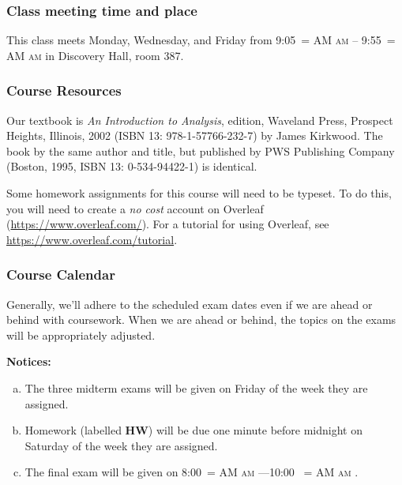 \documentclass[12pt]{article}
\makeatletter
\newcounter{ex}\setcounter{ex}{0}
\newenvironment{alphalist}{
  \begin{enumerate}[(a)]
    \addtolength{\itemsep}{-0.5\itemsep}}
  {\end{enumerate}}
\DeclareRobustCommand{\maybefakesc}[1]{%
  \ifnum\pdfstrcmp{\f@series}{\bfdefault}=\z@
    {\fontsize{\dimexpr0.8\dimexpr\f@size pt\relax}{0}\selectfont\uppercase{#1}}%
  \else
    \textsc{#1}%
  \fi
}
\newcommand\AM{\,\maybefakesc{am}\xspace}
\newcommand{\room}{Discovery Hall, room  387}
\newcommand{\meetingtime}{This class meets Monday, Wednesday, and Friday  from 
	9:05\AM -- 9:55\AM}
\newcommand{\finaldateandtime}{\printdate{13/12/\the\year} 8:00\AM{}---10:00 \AM}
\makeatother
\begin{document}
\subsubsection*{Class meeting time and place}

\meetingtime in \room.

\subsubsection*{Course Resources}

Our textbook is \emph{An Introduction to Analysis},  edition, Waveland Press, Prospect Heights, Illinois, 2002 (ISBN 13: 978-1-57766-232-7) by James Kirkwood. The book by the same author and title, but published by PWS Publishing Company (Boston, 1995, ISBN 13:
0-534-94422-1) is identical.

 Some homework assignments for this course will need to be typeset. To do this, you will need to create a \emph{no cost} 
account on Overleaf (\url{https://www.overleaf.com/}).   For a  tutorial for using Overleaf, see \url{https://www.overleaf.com/tutorial}.



\subsubsection*{Course Calendar}

Generally, we'll adhere to the scheduled exam dates even if we are ahead or behind with coursework.  
When we are ahead or behind, the topics on the exams will be appropriately adjusted.  


\vspace{0.1in}
\noindent \textbf{Notices:}


\begin{alphalist}
   \item The three midterm exams will be given on Friday of the week they are assigned.
   
    \item Homework (labelled \textbf{HW}) will be due one minute before midnight on  Saturday of the week they are assigned.  

    \item The final exam will be given on \finaldateandtime.
    
\end{alphalist}

\vspace{0.1in}
\end{document}
